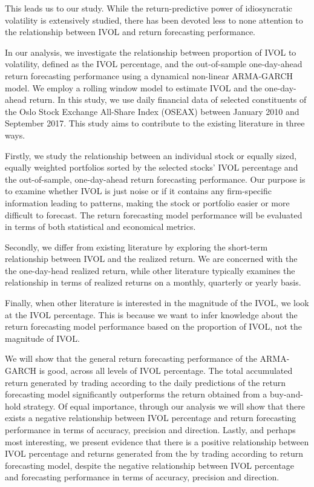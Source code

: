 This leads us to our study. While the return-predictive power of idiosyncratic volatility is extensively studied, there has been devoted less to none attention to the relationship between IVOL and return forecasting performance. 

In our analysis, we investigate the relationship between proportion of IVOL to volatility, defined as the IVOL percentage, and the out-of-sample one-day-ahead return forecasting performance using a dynamical non-linear ARMA-GARCH model. We employ a rolling window model to estimate IVOL and the one-day-ahead return. In this study, we use daily financial data of selected constituents of the Oslo Stock Exchange All-Share Index (OSEAX) between January 2010 and September 2017. This study aims to contribute to the existing literature in three ways. 

Firstly, we study the relationship between an individual stock or equally sized, equally weighted portfolios sorted by the selected stocks' IVOL percentage and the out-of-sample, one-day-ahead return forecasting performance. Our purpose is to examine whether IVOL is just noise or if it contains any firm-specific information leading to patterns, making the stock or portfolio easier or more difficult to forecast. The return forecasting model performance will be evaluated in terms of both statistical and economical metrics.

Secondly, we differ from existing literature by exploring the short-term relationship between IVOL and the realized return. We are concerned with the the one-day-head realized return, while other literature typically examines the relationship in terms of realized returns on a monthly, quarterly or yearly basis.

Finally, when other literature is interested in the magnitude of the IVOL, we look at the IVOL percentage. This is because we want to infer knowledge about the return forecasting model performance based on the proportion of IVOL, not the magnitude of IVOL.

We will show that the general return forecasting performance of the ARMA-GARCH is good, across all levels of IVOL percentage. The total accumulated return generated by trading according to the daily predictions of the return forecasting model significantly outperforms the return obtained from a buy-and-hold strategy. Of equal importance, through our analysis we will show that there exists a negative relationship between IVOL percentage and return forecasting performance in terms of accuracy, precision and direction. Lastly, and perhaps most interesting, we present evidence that there is a positive relationship between IVOL percentage and returns generated from the by trading according to return forecasting model, despite the negative relationship between IVOL percentage and forecasting performance in terms of accuracy, precision and direction. 

